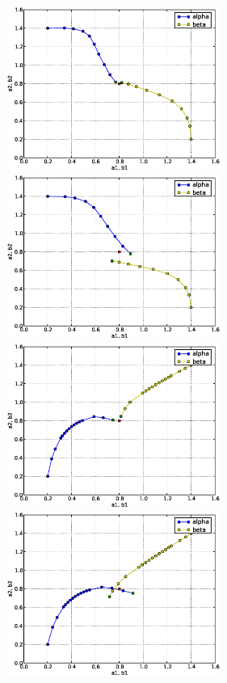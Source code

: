 \begin{figure}
  \begin{center}
    \includegraphics[width=7cm]{chapters/schroll/eps/4D-1scan1.eps}
    \includegraphics[width=7cm]{chapters/schroll/eps/4D-1scan1-5.eps}
    \includegraphics[width=7cm]{chapters/schroll/eps/4D-1scan2.eps}
    \includegraphics[width=7cm]{chapters/schroll/eps/4D-1scan2-5.eps}

\end{center}
\end{figure}
